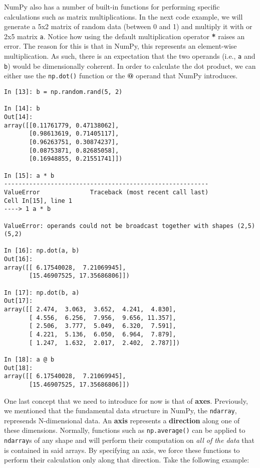 NumPy also has a number of built-in functions for performing specific
calculations such as matrix multiplications. In the next code example, we will
generate a 5x2 matrix of random data (between 0 and 1) and multiply it with
or 2x5 matrix \texttt{a}. Notice how using the default multiplication operator
\textbf{*} raises an error. The reason for this is that in NumPy, this
represents an element-wise multiplication. As such, there is an expectation that
the two operands (i.e., \texttt{a} and \texttt{b}) would be dimensionally
coherent. In order to calculate the dot product, we can either use the
\texttt{np.dot()} function or the \textbf{@} operand that NumPy introduces.

\begin{lstlisting}[style=pythonstyle]
In [13]: b = np.random.rand(5, 2)

In [14]: b
Out[14]:
array([[0.11761779, 0.47138062],
       [0.98613619, 0.71405117],
       [0.96263751, 0.30874237],
       [0.08753871, 0.82685058],
       [0.16948855, 0.21551741]])

In [15]: a * b
---------------------------------------------------------
ValueError              Traceback (most recent call last)
Cell In[15], line 1
----> 1 a * b

ValueError: operands could not be broadcast together with shapes (2,5) (5,2)

In [16]: np.dot(a, b)
Out[16]:
array([[ 6.17540028,  7.21069945],
       [15.46907525, 17.35686806]])

In [17]: np.dot(b, a)
Out[17]:
array([[ 2.474,  3.063,  3.652,  4.241,  4.830],
       [ 4.556,  6.256,  7.956,  9.656, 11.357],
       [ 2.506,  3.777,  5.049,  6.320,  7.591],
       [ 4.221,  5.136,  6.050,  6.964,  7.879],
       [ 1.247,  1.632,  2.017,  2.402,  2.787]])

In [18]: a @ b
Out[18]:
array([[ 6.17540028,  7.21069945],
       [15.46907525, 17.35686806]])
\end{lstlisting}

One last concept that we need to introduce for now is that of \textbf{axes}.
Previously, we mentioned that the fundamental data structure in NumPy, the
\texttt{ndarray}, represends N-dimensional data. An \textbf{axis} represents
a \textbf{direction} along one of these dimensions. Normally, functions such
as \texttt{np.average()} can be applied to \texttt{ndarray}s of any shape and
will perform their computation on \textit{all of the data} that is contained
in said arrays. By specifying an axis, we force these functions to perform their
calculation only along that direction. Take the following example:

